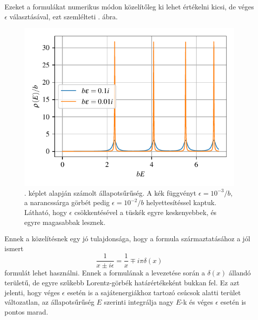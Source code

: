 Ezeket a formulákat numerikus módon közelítőleg ki lehet értékelni kicsi, de véges $\epsilon$ választásával, ezt szemlélteti . ábra.
\begin{figure}[H]
	\centering
	\includegraphics[scale=1]{./figs/dosfromgreen.pdf}
	\caption[Állapotsűrűség]{. képlet alapján számolt állapotsűrűség. A kék függvényt $\epsilon = 10^{-3}/b$, a narancssárga görbét pedig $\epsilon = 10^{-2}/b$ helyettesítéssel kaptuk. Látható, hogy $\epsilon$ csökkentésével a tüskék egyre keskenyebbek, és egyre magasabbak lesznek.}
	\label{green:állapotsűrség}
\end{figure}
Ennek a közelítésnek egy jó tulajdonsága, hogy a formula származtatásához a jól ismert
\begin{equation}
	\frac{1}{x\pm i\epsilon} = \frac{1}{x}\mp i\pi\delta(x)
\end{equation}
formulát lehet használni. Ennek a formulának a levezetése során a $\delta(x)$ állandó területű, de egyre szűkebb Lorentz-görbék határértékeként bukkan fel. Ez azt jelenti, hogy véges $\epsilon$ esetén is a sajátenergiákhoz tartozó csúcsok alatti terület változatlan, az állapotsűrűség $E$ szerinti integrálja nagy $E$-k és véges $\epsilon$ esetén is pontos marad.
